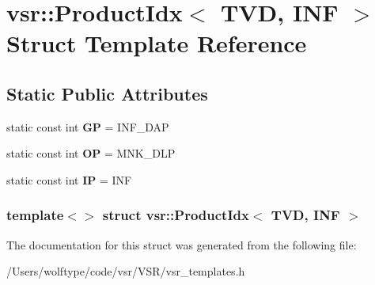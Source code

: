 \hypertarget{structvsr_1_1_product_idx_3_01_t_v_d_00_01_i_n_f_01_4}{\section{vsr\-:\-:Product\-Idx$<$ T\-V\-D, I\-N\-F $>$ Struct Template Reference}
\label{structvsr_1_1_product_idx_3_01_t_v_d_00_01_i_n_f_01_4}
}
\subsection*{Static Public Attributes}
\begin{DoxyCompactItemize}
\item 
\hypertarget{structvsr_1_1_product_idx_3_01_t_v_d_00_01_i_n_f_01_4_a4ea7096e625aad77a514984db12e21f6}{static const int {\bfseries G\-P} = I\-N\-F\-\_\-\-D\-A\-P}\label{structvsr_1_1_product_idx_3_01_t_v_d_00_01_i_n_f_01_4_a4ea7096e625aad77a514984db12e21f6}

\item 
\hypertarget{structvsr_1_1_product_idx_3_01_t_v_d_00_01_i_n_f_01_4_a539ee548b704aa1d59eda25c5fc2a085}{static const int {\bfseries O\-P} = M\-N\-K\-\_\-\-D\-L\-P}\label{structvsr_1_1_product_idx_3_01_t_v_d_00_01_i_n_f_01_4_a539ee548b704aa1d59eda25c5fc2a085}

\item 
\hypertarget{structvsr_1_1_product_idx_3_01_t_v_d_00_01_i_n_f_01_4_af472075eda571a3a285ad4a39ebbb2ae}{static const int {\bfseries I\-P} = I\-N\-F}\label{structvsr_1_1_product_idx_3_01_t_v_d_00_01_i_n_f_01_4_af472075eda571a3a285ad4a39ebbb2ae}

\end{DoxyCompactItemize}
\subsubsection*{template$<$$>$ struct vsr\-::\-Product\-Idx$<$ T\-V\-D, I\-N\-F $>$}



The documentation for this struct was generated from the following file\-:\begin{DoxyCompactItemize}
\item 
/\-Users/wolftype/code/vsr/\-V\-S\-R/vsr\-\_\-templates.\-h\end{DoxyCompactItemize}
